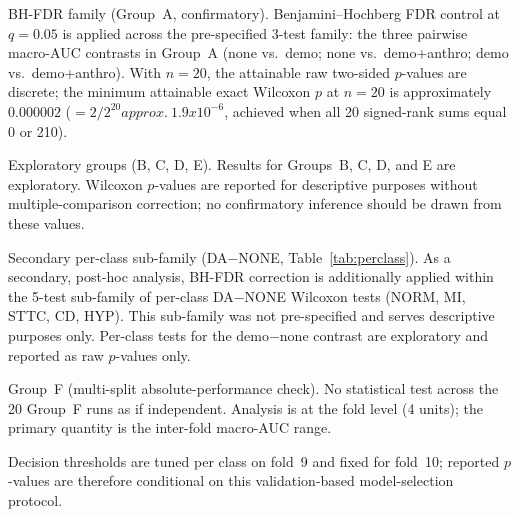 \documentclass[mathematics,article,pdftex]{Definitions/mdpi}
\def\texttt#1{#1}%
\def\textbf#1{#1}%
\def\times{x}%
\def\approx{approx.\ }%
\begin{document}
\textbf{BH-FDR family (Group~A, confirmatory).} Benjamini--Hochberg FDR control at $q{=}0.05$ is applied across the \textbf{pre-specified 3-test family}: the three pairwise macro-AUC contrasts in Group~A (none vs.\ demo; none vs.\ demo+anthro; demo vs.\ demo+anthro). With $n{=}20$, the attainable raw two-sided $p$-values are discrete; the minimum attainable exact Wilcoxon $p$ at $n{=}20$ is approximately $0.000002$ ($= 2/2^{20} \approx 1.9\times10^{-6}$, achieved when all 20 signed-rank sums equal 0 or 210).

\textbf{Exploratory groups (B, C, D, E).} Results for Groups~B, C, D, and E are exploratory. Wilcoxon $p$-values are reported for descriptive purposes without multiple-comparison correction; no confirmatory inference should be drawn from these values.

\textbf{Secondary per-class sub-family (DA$-$NONE, Table~\ref{tab:perclass}).} As a secondary, post-hoc analysis, BH-FDR correction is additionally applied within the 5-test sub-family of per-class DA$-$NONE Wilcoxon tests (NORM, MI, STTC, CD, HYP). This sub-family was not pre-specified and serves descriptive purposes only. Per-class tests for the \texttt{demo}$-$\texttt{none} contrast are exploratory and reported as raw $p$-values only.

\textbf{Group~F (multi-split absolute-performance check).} No statistical test across the 20 Group~F runs as if independent. Analysis is at the fold level (4 units); the primary quantity is the inter-fold macro-AUC range.

Decision thresholds are tuned per class on fold~9 and fixed for fold~10; reported $p$-values are therefore conditional on this validation-based model-selection protocol.
\end{document}
